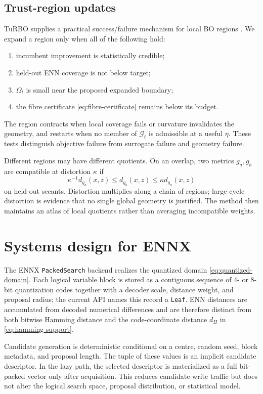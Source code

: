 \documentclass[11pt]{article}
\theoremstyle{definition}
\theoremstyle{remark}
\newcommand{\Gg}{\mathcal G}
\newcommand{\1}{\mathbf 1}
\begin{document}
\subsection{Trust-region updates}

TuRBO supplies a practical success/failure mechanism for local BO regions \cite{TuRBO}.  We expand
a region only when all of the following hold:
\begin{enumerate}
\item incumbent improvement is statistically credible;
\item held-out ENN coverage is not below target;
\item $\Omega_t$ is small near the proposed expanded boundary;
\item the fibre certificate \eqref{eq:fibre-certificate} remains below its budget.
\end{enumerate}
The region contracts when local coverage fails or curvature invalidates the geometry, and restarts when
no member of $\Gg_t$ is admissible at a useful $\eta$.  These tests distinguish objective failure
from surrogate failure and geometry failure.

Different regions may have different quotients.  On an overlap, two metrics $g_a,g_b$ are
compatible at distortion $\kappa$ if
\begin{equation}\label{eq:transition}
  \kappa^{-1}d_{g_a}(x,z)\le d_{g_b}(x,z)
  \le\kappa d_{g_a}(x,z)
\end{equation}
on held-out secants.  Distortion multiplies along a chain of regions; large cycle distortion is
evidence that no single global geometry is justified.  The method then maintains an atlas of local
quotients rather than averaging incompatible weights.

\section{Systems design for ENNX}

The ENNX \texttt{PackedSearch} backend realizes the quantized domain
\eqref{eq:quantized-domain}.  Each logical variable block is stored as a contiguous sequence of
4- or 8-bit quantization codes together with a decoder scale, distance weight, and proposal radius;
the current API names this record a \texttt{Leaf}.  ENN distances are accumulated from decoded
numerical differences and are therefore distinct from both bitwise Hamming distance and the
code-coordinate distance $d_H$ in \eqref{eq:hamming-support}.

Candidate generation is deterministic conditional on a centre, random seed, block metadata, and
proposal length.  The tuple of these values is an implicit candidate descriptor.  In the lazy path,
the selected descriptor is materialized as a full bit-packed vector only after acquisition.  This
reduces candidate-write traffic but does not alter the logical search space, proposal distribution,
or statistical model.
\end{document}
